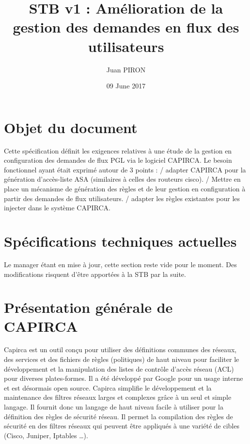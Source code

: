 \documentclass{article}
\title{STB v1 : Amélioration de la gestion des demandes en flux des utilisateurs}
\author{Juan PIRON}
\date{09 June 2017}
\begin{document}
\maketitle
\section{Objet du document}

Cette spécification définit les exigences relatives à une étude de la gestion en configuration des demandes de flux PGL via le logiciel CAPIRCA. Le besoin fonctionnel ayant était exprimé autour de 3 points :
/ adapter CAPIRCA pour la génération d’accès-liste ASA (similaires à celles des routeurs cisco).
/ Mettre en place un mécanisme de génération des règles et de leur gestion en configuration à partir des demandes de flux utilisateurs. 
/ adapter les règles existantes pour les injecter dans le système CAPIRCA.

\maketitle
\section{Spécifications techniques actuelles}

{\color{red} Le manager étant en mise à jour, cette section reste vide pour le moment. Des modifications risquent d'être apportées à la STB par la suite.}

\maketitle
\section{Présentation générale de CAPIRCA}

Capirca est un outil conçu pour utiliser des définitions communes des réseaux, des services et des fichiers de règles (politiques) de haut niveau pour faciliter le développement et la manipulation des listes de contrôle d'accès réseau (ACL) pour diverses plates-formes. Il a été développé par Google pour un usage interne et est désormais open source.
Capirca simplifie le développement et la maintenance des filtres réseaux larges et complexes grâce à un seul et simple langage. Il fournit donc un langage de haut niveau facile à utiliser pour la définition des règles de sécurité réseau. Il permet la compilation des règles de sécurité en des filtres réseaux qui peuvent être appliqués à une variété de cibles (Cisco, Juniper, Iptables …).
\end{document}
